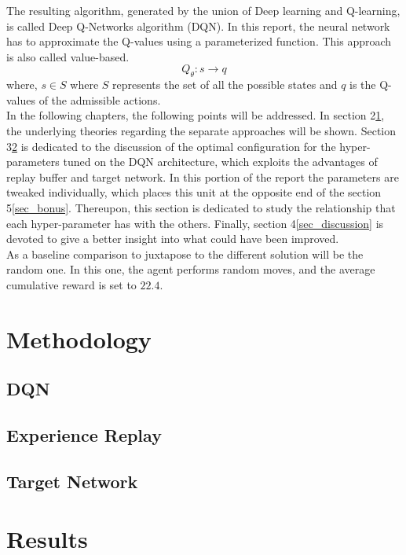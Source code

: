 \documentclass{article}
\begin{document}
The resulting algorithm, generated by the union of Deep learning and Q-learning, is called Deep Q-Networks algorithm (DQN). 
In this report, the neural network has to approximate the Q-values using a parameterized function. This approach is also called value-based.
\begin{equation}
    Q_{\theta} :  s \rightarrow q
\end{equation}
where, $s \in S$ where $S$ represents the set of all the possible states and $q$ is the Q-values of the admissible actions.\\
In the following chapters, the following points will be addressed. 
In section 2\ref{sec_Methodology}, the underlying theories regarding the separate approaches will be shown.
Section 3\ref{sec_results} is dedicated to the discussion of the optimal configuration for the hyper-parameters tuned on the DQN architecture, which exploits the advantages of replay buffer and target network. 
In this portion of the report the parameters are tweaked individually, which places this unit at the opposite end of the section 5\ref{sec_bonus}. 
Thereupon, this section is dedicated to study the relationship that each hyper-parameter has with the others.
Finally, section 4\ref{sec_discussion} is devoted to give a better insight into what could have been improved.\\
As a baseline comparison to juxtapose to the different solution will be the random one. In this one, the agent performs random moves, and the average cumulative reward is set to $22.4$.

\section{Methodology}
\label{sec_Methodology}

\subsection{DQN}

\subsection{Experience Replay}

\subsection{Target Network}



\section{Results}
\label{sec_results}
\end{document}
